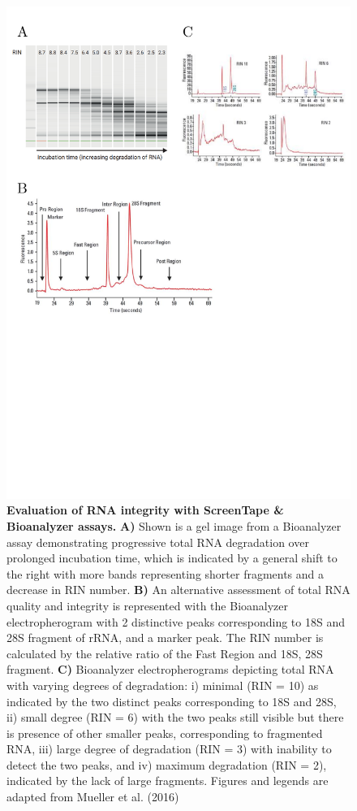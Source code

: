 \begin{figure}[htp]
	\centering
	\vspace{20pt}
	\includegraphics[page=1,trim={0 10cm 0 0 },clip, scale = 0.7]{Figures/General_Methodology_Figures.pdf}
	\captionsetup{width=0.95\textwidth}
	\caption[Evaluation of RNA integrity with ScreenTape \& Bioanalyzer assays]%
	{\textbf{Evaluation of RNA integrity with ScreenTape \& Bioanalyzer assays.} \textbf{A)} Shown is a gel image from a Bioanalyzer assay demonstrating progressive total RNA degradation over prolonged incubation time, which is indicated by a general shift to the right with more bands representing shorter fragments and a decrease in RIN number. \textbf{B)} An alternative assessment of total RNA quality and integrity is represented with the Bioanalyzer electropherogram with 2 distinctive peaks corresponding to 18S and 28S fragment of rRNA, and a marker peak. The RIN number is calculated by the relative ratio of the Fast Region and 18S, 28S fragment. \textbf{C)} Bioanalyzer electropherograms depicting total RNA with varying degrees of degradation: i) minimal (RIN = 10) as indicated by the two distinct peaks corresponding to 18S and 28S, ii) small degree (RIN = 6) with the two peaks still visible but there is presence of other smaller peaks, corresponding to fragmented RNA, iii) large degree of degradation (RIN = 3) with inability to detect the two peaks, and iv) maximum degradation (RIN = 2), indicated by the lack of large fragments. Figures and legends are adapted from Mueller et al. (2016)}
	\label{fig:bionalayzer_pics}
\end{figure}

